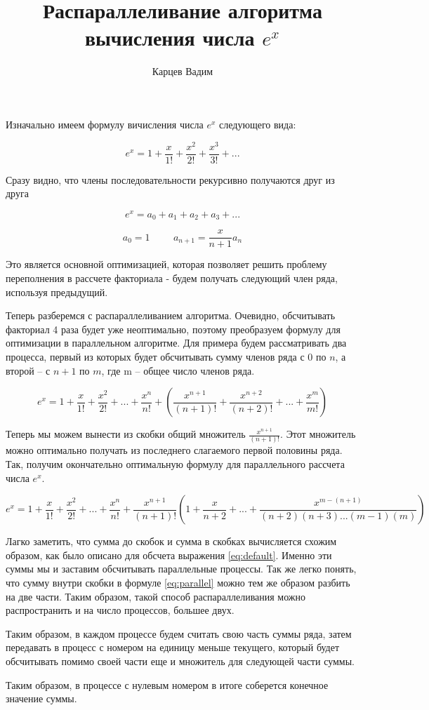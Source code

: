 \documentclass[12pt]{article}
\author{Карцев Вадим}
\title{Распараллеливание алгоритма вычисления числа $e^x$}
\begin{document}
  Изначально имеем формулу вичисления числа $e^x$ следующего вида:

  \begin{equation} \label{eq:default}
    e^x = 1 + \frac{x}{1!} + \frac{x^2}{2!} + \frac{x^3}{3!} + ...
  \end{equation}

  Сразу видно, что члены последовательности рекурсивно получаются друг из друга

  $$
    e^x = a_0 + a_1 + a_2 + a_3 + ...
  $$

  $$
    a_0 = 1 \hspace{1cm}
    a_{n+1} = \frac{x}{n+1} a_n
  $$

  Это является основной оптимизацией, которая позволяет решить проблему
  переполнения в рассчете факториала - будем получать следующий член ряда,
  используя предыдущий.

  Теперь разберемся с распараллеливанием алгоритма. Очевидно, обсчитывать
  факториал 4 раза будет уже неоптимально, поэтому преобразуем формулу для
  оптимизации в параллельном алгоритме. Для примера будем рассматривать два
  процесса, первый из которых будет обсчитывать сумму членов ряда с $0$ по $n$,
  а второй -- с $n+1$ по $m$, где m -- общее число членов ряда.

  \begin{equation}
    e^x = 1 + \frac{x}{1!} + \frac{x^2}{2!} + ... + \frac{x^n}{n!} +
    \left(\frac{x^{n+1}}{(n+1)!} + \frac{x^{n+2}}{(n+2)!} + ... +
    \frac{x^m}{m!}\right)
  \end{equation}

  Теперь мы можем вынести из скобки общий множитель $\frac{x^{n+1}}{(n+1)!}$.
  Этот множитель можно оптимально получать из последнего слагаемого первой
  половины ряда. Так, получим окончательно оптимальную формулу для параллельного
  рассчета числа $e^x$.

  \begin{equation} \label{eq:parallel}
    e^x = 1 + \frac{x}{1!} + \frac{x^2}{2!} + ... + \frac{x^n}{n!} +
    \frac{x^{n+1}}{(n+1)!} \left(1 + \frac{x}{n+2} + ... +
    \frac{x^{m-(n+1)}}{(n+2)(n+3)...(m-1)(m)}\right)
  \end{equation}

  Лагко заметить, что сумма до скобок и сумма в скобках вычисляется схожим
  образом, как было описано для обсчета выражения \ref{eq:default}. Именно эти
  суммы мы и заставим обсчитывать параллельные процессы. Так же легко понять,
  что сумму внутри скобки в формуле \ref{eq:parallel} можно тем же образом
  разбить на две части. Таким образом, такой способ распараллеливания можно
  распространить и на число процессов, большее двух.

  Таким образом, в каждом процессе будем считать свою часть суммы ряда, затем
  передавать в процесс с номером на единицу меньше текущего, который будет
  обсчитывать помимо своей части еще и множитель для следующей части суммы.

  Таким образом, в процессе с нулевым номером в итоге соберется конечное
  значение суммы.
\end{document}
